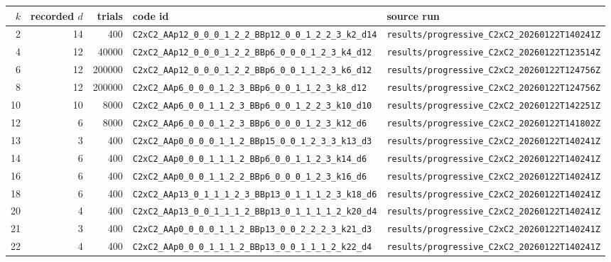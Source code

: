 \documentclass[11pt]{article}
\begin{document}
\begin{longtable}{@{}r r r l l@{}}
\toprule
$k$ & recorded $d$ & trials & code id & source run \\
\midrule
\endhead
2 & 14 & 400 & \texttt{C2xC2\_AAp12\_0\_0\_0\_1\_2\_2\_BBp12\_0\_0\_1\_2\_2\_3\_k2\_d14} & \texttt{results/progressive\_C2xC2\_20260122T140241Z} \\
4 & 12 & 40000 & \texttt{C2xC2\_AAp12\_0\_0\_0\_1\_2\_2\_BBp6\_0\_0\_0\_1\_2\_3\_k4\_d12} & \texttt{results/progressive\_C2xC2\_20260122T123514Z} \\
6 & 12 & 200000 & \texttt{C2xC2\_AAp12\_0\_0\_0\_1\_2\_2\_BBp6\_0\_0\_1\_1\_2\_3\_k6\_d12} & \texttt{results/progressive\_C2xC2\_20260122T124756Z} \\
8 & 12 & 200000 & \texttt{C2xC2\_AAp6\_0\_0\_0\_1\_2\_3\_BBp6\_0\_0\_1\_1\_2\_3\_k8\_d12} & \texttt{results/progressive\_C2xC2\_20260122T124756Z} \\
10 & 10 & 8000 & \texttt{C2xC2\_AAp6\_0\_0\_1\_1\_2\_3\_BBp6\_0\_0\_1\_2\_2\_3\_k10\_d10} & \texttt{results/progressive\_C2xC2\_20260122T142251Z} \\
12 & 6 & 8000 & \texttt{C2xC2\_AAp6\_0\_0\_0\_1\_2\_3\_BBp6\_0\_0\_0\_1\_2\_3\_k12\_d6} & \texttt{results/progressive\_C2xC2\_20260122T141802Z} \\
13 & 3 & 400 & \texttt{C2xC2\_AAp0\_0\_0\_0\_1\_1\_2\_BBp15\_0\_0\_1\_2\_3\_3\_k13\_d3} & \texttt{results/progressive\_C2xC2\_20260122T140241Z} \\
14 & 6 & 400 & \texttt{C2xC2\_AAp0\_0\_0\_1\_1\_1\_2\_BBp6\_0\_0\_1\_1\_2\_3\_k14\_d6} & \texttt{results/progressive\_C2xC2\_20260122T140241Z} \\
16 & 6 & 400 & \texttt{C2xC2\_AAp0\_0\_0\_1\_1\_2\_2\_BBp6\_0\_0\_0\_1\_2\_3\_k16\_d6} & \texttt{results/progressive\_C2xC2\_20260122T140241Z} \\
18 & 6 & 400 & \texttt{C2xC2\_AAp13\_0\_1\_1\_1\_2\_3\_BBp13\_0\_1\_1\_1\_2\_3\_k18\_d6} & \texttt{results/progressive\_C2xC2\_20260122T140241Z} \\
20 & 4 & 400 & \texttt{C2xC2\_AAp13\_0\_0\_1\_1\_1\_2\_BBp13\_0\_1\_1\_1\_1\_2\_k20\_d4} & \texttt{results/progressive\_C2xC2\_20260122T140241Z} \\
21 & 3 & 400 & \texttt{C2xC2\_AAp0\_0\_0\_0\_1\_1\_2\_BBp13\_0\_0\_2\_2\_2\_3\_k21\_d3} & \texttt{results/progressive\_C2xC2\_20260122T140241Z} \\
22 & 4 & 400 & \texttt{C2xC2\_AAp0\_0\_0\_1\_1\_1\_2\_BBp13\_0\_0\_1\_1\_1\_2\_k22\_d4} & \texttt{results/progressive\_C2xC2\_20260122T140241Z} \\

\end{longtable}
\end{document}
